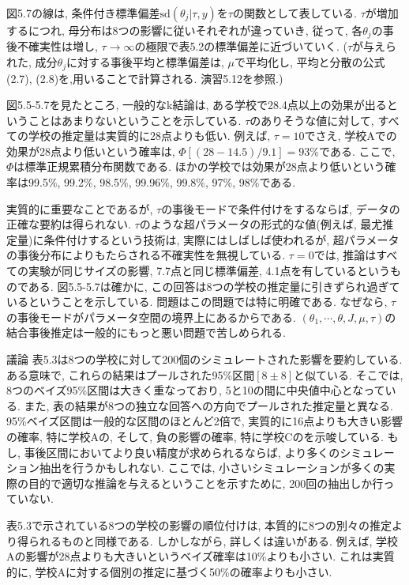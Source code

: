 \documentclass[10pt,dvipdfmx,a4]{beamer}
\begin{document}

\begin{frame}
図5.7の線は, 条件付き標準偏差$\text{sd}(\theta_j|\tau,y)$を$\tau$の関数として表している.
$\tau$が増加するにつれ, 母分布は8つの影響に従いそれぞれが違っていき, 従って, 各$\theta_j$の事後不確実性は増し, $\tau\rightarrow \infty$の極限で表5.2の標準偏差に近づいていく.
($\tau$が与えられた, 成分$\theta_j$に対する事後平均と標準偏差は, $\mu$で平均化し, 平均と分散の公式(2.7), (2.8)を,用いることで計算される.
演習5.12を参照.)

図5.5-5.7を見たところ, 一般的なk結論は, ある学校で28.4点以上の効果が出るということはあまりないということを示している.
$\tau$のありそうな値に対して, すべての学校の推定量は実質的に28点よりも低い.
例えば, $\tau=10$でさえ, 学校Aでの効果が28点より低いという確率は, $\Phi[(28-14.5)/9.1]=93\%$である.
ここで, $\Phi$は標準正規累積分布関数である.
ほかの学校では効果が28点より低いという確率は99.5\%, 99.2\%, 98.5\%, 99.96\%, 99.8\%, 97\%, 98\%である.
\end{frame}


\begin{frame}
実質的に重要なことであるが, $\tau$の事後モードで条件付けをするならば, データの正確な要約は得られない.
$\tau$のような超パラメータの形式的な値(例えば, 最尤推定量)に条件付けするという技術は, 実際にはしばしば使われるが, 超パラメータの事後分布によりもたらされる不確実性を無視している.
$\tau=0$では, 推論はすべての実験が同じサイズの影響, 7.7点と同じ標準偏差, 4.1点を有しているというものである.
図5.5-5.7は確かに, この回答は8つの学校の推定量に引きずられ過ぎているということを示している.
問題はこの問題では特に明確である.
なぜなら, $\tau$の事後モードがパラメータ空間の境界上にあるからである.
$(\theta_1,\cdots,\theta,J,\mu,\tau)$の結合事後推定は一般的にもっと悪い問題で苦しめられる.
\end{frame}


\begin{frame}{議論}
表5.3は8つの学校に対して200個のシミュレートされた影響を要約している.
ある意味で, これらの結果はプールされた95\%区間$[8\pm 8]$と似ている.
そこでは, 8つのベイズ95\%区間は大きく重なっており, 5と10の間に中央値中心となっている.
また, 表の結果が8つの独立な回答への方向でプールされた推定量と異なる.
95\%ベイズ区間は一般的な区間のほとんど2倍で, 実質的に16点よりも大きい影響の確率, 特に学校Aの, そして, 負の影響の確率, 特に学校Cのを示唆している.
もし, 事後区間においてより良い精度が求められるならば, より多くのシミュレーション抽出を行うかもしれない.
ここでは, 小さいシミュレーションが多くの実際の目的で適切な推論を与えるということを示すために, 200回の抽出しか行っていない.

表5.3で示されている8つの学校の影響の順位付けは, 本質的に8つの別々の推定より得られるものと同様である.
しかしながら, 詳しくは違いがある.
例えば, 学校Aの影響が28点よりも大きいというベイズ確率は10\%よりも小さい.
これは実質的に, 学校Aに対する個別の推定に基づく50\%の確率よりも小さい.
\end{frame}
\end{document}
